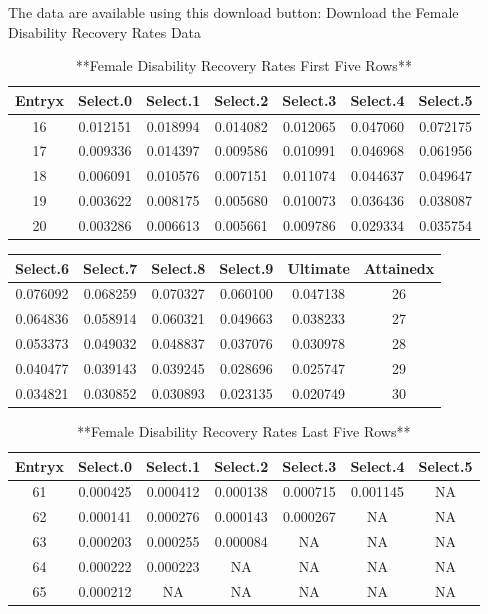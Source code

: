\documentclass[
]{book}
\begin{document}
The data are available using this download button:
Download the Female Disability Recovery Rates Data

\begin{table}

\caption{\label{tab:unnamed-chunk-39}**Female Disability Recovery Rates First Five Rows**}
\centering
\begin{tabular}[t]{c|c|c|c|c|c|c}
\hline
Entryx & Select.0 & Select.1 & Select.2 & Select.3 & Select.4 & Select.5\\
\hline
16 & 0.012151 & 0.018994 & 0.014082 & 0.012065 & 0.047060 & 0.072175\\
\hline
17 & 0.009336 & 0.014397 & 0.009586 & 0.010991 & 0.046968 & 0.061956\\
\hline
18 & 0.006091 & 0.010576 & 0.007151 & 0.011074 & 0.044637 & 0.049647\\
\hline
19 & 0.003622 & 0.008175 & 0.005680 & 0.010073 & 0.036436 & 0.038087\\
\hline
20 & 0.003286 & 0.006613 & 0.005661 & 0.009786 & 0.029334 & 0.035754\\
\hline
\end{tabular}
\end{table}

\begin{tabular}{c|c|c|c|c|c}
\hline
Select.6 & Select.7 & Select.8 & Select.9 & Ultimate & Attainedx\\
\hline
0.076092 & 0.068259 & 0.070327 & 0.060100 & 0.047138 & 26\\
\hline
0.064836 & 0.058914 & 0.060321 & 0.049663 & 0.038233 & 27\\
\hline
0.053373 & 0.049032 & 0.048837 & 0.037076 & 0.030978 & 28\\
\hline
0.040477 & 0.039143 & 0.039245 & 0.028696 & 0.025747 & 29\\
\hline
0.034821 & 0.030852 & 0.030893 & 0.023135 & 0.020749 & 30\\
\hline
\end{tabular}

\begin{table}

\caption{\label{tab:unnamed-chunk-39}**Female Disability Recovery Rates Last Five Rows**}
\centering
\begin{tabular}[t]{c|c|c|c|c|c|c}
\hline
Entryx & Select.0 & Select.1 & Select.2 & Select.3 & Select.4 & Select.5\\
\hline
61 & 0.000425 & 0.000412 & 0.000138 & 0.000715 & 0.001145 & NA\\
\hline
62 & 0.000141 & 0.000276 & 0.000143 & 0.000267 & NA & NA\\
\hline
63 & 0.000203 & 0.000255 & 0.000084 & NA & NA & NA\\
\hline
64 & 0.000222 & 0.000223 & NA & NA & NA & NA\\
\hline
65 & 0.000212 & NA & NA & NA & NA & NA\\
\hline
\end{tabular}
\end{table}
\end{document}
